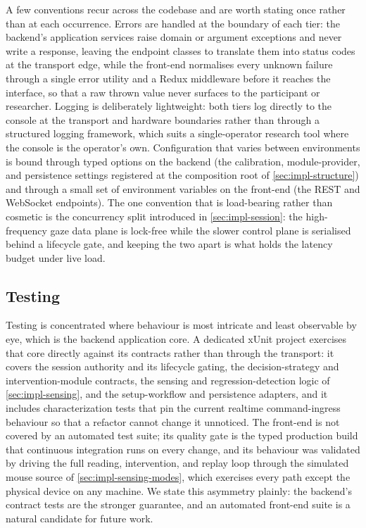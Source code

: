 A few conventions recur across the codebase and are worth stating once rather than at each occurrence.
Errors are handled at the boundary of each tier: the backend's application services raise domain or argument exceptions and never write a response, leaving the endpoint classes to translate them into status codes at the transport edge, while the front-end normalises every unknown failure through a single error utility and a Redux middleware before it reaches the interface, so that a raw thrown value never surfaces to the participant or researcher.
Logging is deliberately lightweight: both tiers log directly to the console at the transport and hardware boundaries rather than through a structured logging framework, which suits a single-operator research tool where the console is the operator's own.
Configuration that varies between environments is bound through typed options on the backend (the calibration, module-provider, and persistence settings registered at the composition root of \cref{sec:impl-structure}) and through a small set of environment variables on the front-end (the REST and WebSocket endpoints).
The one convention that is load-bearing rather than cosmetic is the concurrency split introduced in \cref{sec:impl-session}: the high-frequency gaze data plane is lock-free while the slower control plane is serialised behind a lifecycle gate, and keeping the two apart is what holds the latency budget under live load.

\subsection{Testing}
\label{subsec:impl-testing}

Testing is concentrated where behaviour is most intricate and least observable by eye, which is the backend application core.
A dedicated xUnit project exercises that core directly against its contracts rather than through the transport: it covers the session authority and its lifecycle gating, the decision-strategy and intervention-module contracts, the sensing and regression-detection logic of \cref{sec:impl-sensing}, and the setup-workflow and persistence adapters, and it includes characterization tests that pin the current realtime command-ingress behaviour so that a refactor cannot change it unnoticed.
The front-end is not covered by an automated test suite; its quality gate is the typed production build that continuous integration runs on every change, and its behaviour was validated by driving the full reading, intervention, and replay loop through the simulated mouse source of \cref{sec:impl-sensing-modes}, which exercises every path except the physical device on any machine.
We state this asymmetry plainly: the backend's contract tests are the stronger guarantee, and an automated front-end suite is a natural candidate for future work.

